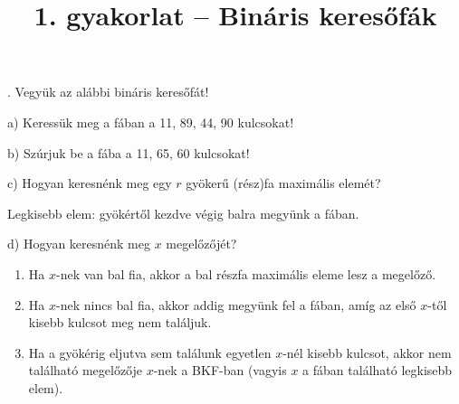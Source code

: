 \documentclass[12pt]{article}
\title{1. gyakorlat -- Bináris keresőfák}
\begin{document}
\maketitle

. Vegyük az alábbi bináris keresőfát!

\begin{figure}[!h]
\centering
\end{figure}

\noindent a) Keressük meg a fában a 11, 89, 44, 90 kulcsokat!

\noindent b) Szúrjuk be a fába a 11, 65, 60 kulcsokat!

\begin{figure}[!h]
\centering
\end{figure}

\noindent c) Hogyan keresnénk meg egy $r$ gyökerű (rész)fa maximális elemét?

Legkisebb elem: gyökértől kezdve végig balra megyünk a fában.

\noindent d) Hogyan keresnénk meg $x$ megelőzőjét?

\begin{enumerate}
\item Ha $x$-nek van bal fia, akkor a bal részfa maximális eleme lesz a megelőző.
\item Ha $x$-nek nincs bal fia, akkor addig megyünk fel a fában, amíg az első $x$-től kisebb kulcsot meg nem találjuk.
\item Ha a gyökérig eljutva sem találunk egyetlen $x$-nél kisebb kulcsot, akkor nem található megelőzője $x$-nek a BKF-ban (vagyis $x$ a fában található legkisebb elem).
\end{enumerate}
\end{document}

